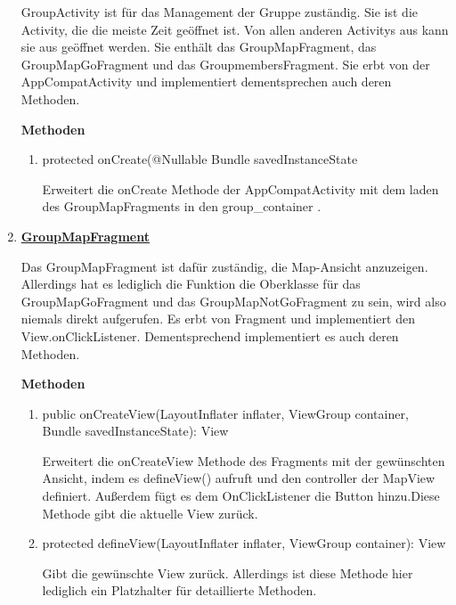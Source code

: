 \begin{enumerate}
	GroupActivity ist für das Management der Gruppe zuständig. Sie ist die Activity, die die meiste Zeit geöffnet ist. Von allen anderen Activitys aus kann sie aus geöffnet werden. Sie enthält das GroupMapFragment, das GroupMapGoFragment und das GroupmembersFragment. Sie erbt von der AppCompatActivity und implementiert dementsprechen auch deren Methoden.
	
	\textbf{Methoden}
	
	\begin{enumerate}
		\item protected onCreate(@Nullable Bundle savedInstanceState

		Erweitert die onCreate Methode der AppCompatActivity mit dem laden des GroupMapFragments in den group\_container .
	\end{enumerate}
	
	\item \textbf{\underline{GroupMapFragment}}

	
	Das GroupMapFragment ist dafür zuständig, die Map-Ansicht anzuzeigen. Allerdings hat es lediglich die Funktion die Oberklasse für das GroupMapGoFragment und das GroupMapNotGoFragment zu sein, wird also niemals direkt aufgerufen. Es erbt von Fragment und implementiert den View.onClickListener. Dementsprechend implementiert es auch deren Methoden.
	
	\textbf{Methoden}	
	\begin{enumerate}
		\item public onCreateView(LayoutInflater inflater, ViewGroup container, Bundle savedInstanceState): View
		
		Erweitert die onCreateView Methode des Fragments mit der gewünschten Ansicht, indem es defineView() aufruft und den controller der MapView definiert. Außerdem fügt es dem OnClickListener die Button hinzu.Diese Methode gibt die aktuelle View zurück.
		
		\item protected defineView(LayoutInflater inflater, ViewGroup container): View

		Gibt die gewünschte View zurück. Allerdings ist diese Methode hier lediglich ein Platzhalter für detaillierte Methoden.
		

\end{enumerate}
\end{enumerate}
